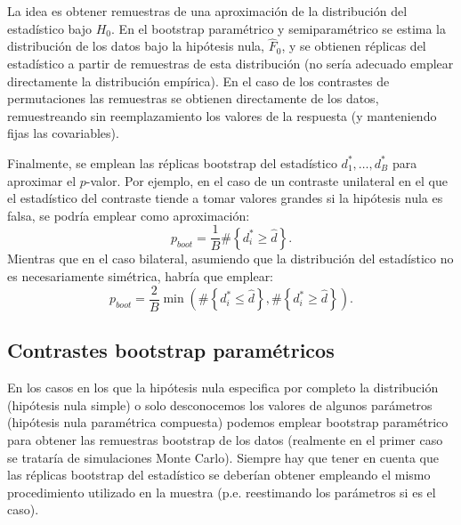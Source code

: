 \documentclass[
  10pt,
]{book}
\theoremstyle{break}
\theoremstyle{nonumberplain}
\begin{document}
La idea es obtener remuestras de una aproximación de la distribución del
estadístico bajo \(H_0\).
En el bootstrap paramétrico y semiparamétrico se estima la distribución
de los datos bajo la hipótesis nula, \(\hat{F}_0\), y se obtienen réplicas del
estadístico a partir de remuestras de esta distribución (no sería adecuado
emplear directamente la distribución empírica).
En el caso de los contrastes de permutaciones las remuestras se obtienen
directamente de los datos, remuestreando sin reemplazamiento los valores
de la respuesta (y manteniendo fijas las covariables).

Finalmente, se emplean las réplicas bootstrap
del estadístico \(d_1^{\ast},\ldots, d_B^{\ast}\) para aproximar el \(p\)-valor.
Por ejemplo, en el caso de un contraste unilateral en el que el estadístico del
contraste tiende a tomar valores grandes si la hipótesis nula es falsa,
se podría emplear como aproximación:
\[p_{boot} = \frac{1}{B}\#\left\{ d_i^{\ast} \geq \hat{d} \right\}.\]
Mientras que en el caso bilateral, asumiendo que la distribución del estadístico
no es necesariamente simétrica, habría que emplear:
\[p_{boot} = \frac{2}{B} \min \left(\#\left\{ d_i^{\ast} \leq \hat{d} \right\},
\#\left\{ d_i^{\ast} \geq \hat{d} \right\}\right).\]

\hypertarget{contrastes-parametricos}{%
\subsection{Contrastes bootstrap paramétricos}\label{contrastes-parametricos}}

En los casos en los que la hipótesis nula especifica por completo la distribución
(hipótesis nula simple) o solo desconocemos los valores de algunos parámetros
(hipótesis nula paramétrica compuesta) podemos emplear
bootstrap paramétrico para obtener las remuestras bootstrap de los datos
(realmente en el primer caso se trataría de simulaciones Monte Carlo).
Siempre hay que tener en cuenta que las réplicas bootstrap del estadístico se
deberían obtener empleando el mismo procedimiento utilizado en la muestra
(p.e. reestimando los parámetros si es el caso).
\end{document}
